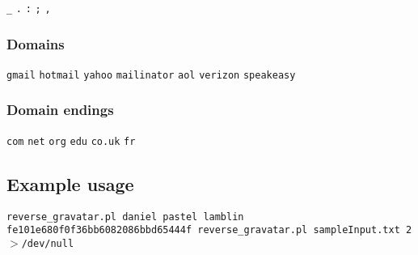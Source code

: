 \texttt{\_} \texttt{.} \texttt{:} \texttt{;} \texttt{,}

\subsubsection*{Domains\label{Domains}}


\texttt{gmail} \texttt{hotmail} \texttt{yahoo} \texttt{mailinator} \texttt{aol} \texttt{verizon} \texttt{speakeasy}

\subsubsection*{Domain endings\label{Domain_endings}}


\texttt{com} \texttt{net} \texttt{org} \texttt{edu} \texttt{co.uk} \texttt{fr}

\subsection*{Example usage\label{Example_usage}}


\texttt{reverse\_gravatar.pl daniel pastel lamblin fe101e680f0f36bb6082086bbd65444f
reverse\_gravatar.pl sampleInput.txt 2$>$/dev/null}

